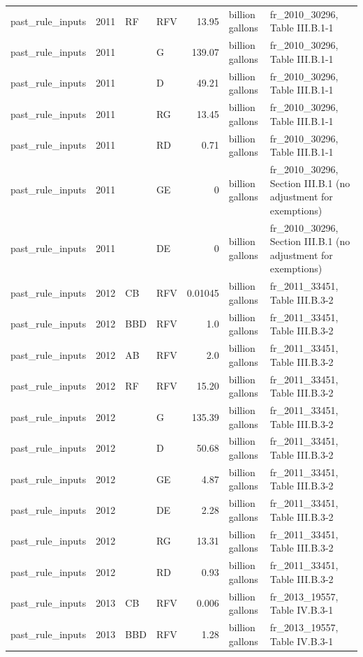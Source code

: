\begin{longtable}{p{2.3cm}p{0.7cm}p{1.0cm}p{2.6cm}rp{1.7cm}p{4.6cm}}
past\_rule\_inputs & 2011 & RF & RFV & 13.95 & billion gallons & fr\_2010\_30296, Table III.B.1-1 \\
past\_rule\_inputs & 2011 &  & G & 139.07 & billion gallons & fr\_2010\_30296, Table III.B.1-1 \\
past\_rule\_inputs & 2011 &  & D & 49.21 & billion gallons & fr\_2010\_30296, Table III.B.1-1 \\
past\_rule\_inputs & 2011 &  & RG & 13.45 & billion gallons & fr\_2010\_30296, Table III.B.1-1 \\
past\_rule\_inputs & 2011 &  & RD & 0.71 & billion gallons & fr\_2010\_30296, Table III.B.1-1 \\
past\_rule\_inputs & 2011 &  & GE & 0 & billion gallons & fr\_2010\_30296, Section III.B.1 (no adjustment for exemptions) \\
past\_rule\_inputs & 2011 &  & DE & 0 & billion gallons & fr\_2010\_30296, Section III.B.1 (no adjustment for exemptions) \\
past\_rule\_inputs & 2012 & CB & RFV & 0.01045 & billion gallons & fr\_2011\_33451, Table III.B.3-2 \\
past\_rule\_inputs & 2012 & BBD & RFV & 1.0 & billion gallons & fr\_2011\_33451, Table III.B.3-2 \\
past\_rule\_inputs & 2012 & AB & RFV & 2.0 & billion gallons & fr\_2011\_33451, Table III.B.3-2 \\
past\_rule\_inputs & 2012 & RF & RFV & 15.20 & billion gallons & fr\_2011\_33451, Table III.B.3-2 \\
past\_rule\_inputs & 2012 &  & G & 135.39 & billion gallons & fr\_2011\_33451, Table III.B.3-2 \\
past\_rule\_inputs & 2012 &  & D & 50.68 & billion gallons & fr\_2011\_33451, Table III.B.3-2 \\
past\_rule\_inputs & 2012 &  & GE & 4.87 & billion gallons & fr\_2011\_33451, Table III.B.3-2 \\
past\_rule\_inputs & 2012 &  & DE & 2.28 & billion gallons & fr\_2011\_33451, Table III.B.3-2 \\
past\_rule\_inputs & 2012 &  & RG & 13.31 & billion gallons & fr\_2011\_33451, Table III.B.3-2 \\
past\_rule\_inputs & 2012 &  & RD & 0.93 & billion gallons & fr\_2011\_33451, Table III.B.3-2 \\
past\_rule\_inputs & 2013 & CB & RFV & 0.006 & billion gallons & fr\_2013\_19557, Table IV.B.3-1 \\
past\_rule\_inputs & 2013 & BBD & RFV & 1.28 & billion gallons & fr\_2013\_19557, Table IV.B.3-1 \\

\end{longtable}
